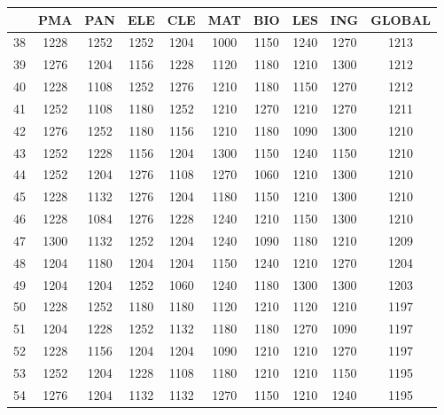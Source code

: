 \documentclass{article}
\begin{document}
\begin{table}
\centering
\begin{tabular}{c|c|c|c|c|c|c|c|c|c|}
\cline{2-10}
& \textbf{PMA} & \textbf{PAN} & \textbf{ELE} & \textbf{CLE} & \textbf{MAT} & \textbf{BIO} & \textbf{LES} & \textbf{ING} & \textbf{GLOBAL} \\ \hline
\multicolumn{1}{|c|}{38}  & 1228 & 1252 & 1252 & 1204 & 1000 & 1150 & 1240 & 1270 & 1213 \\ \hline
\multicolumn{1}{|c|}{39}  & 1276 & 1204 & 1156 & 1228 & 1120 & 1180 & 1210 & 1300 & 1212 \\ \hline
\multicolumn{1}{|c|}{40}  & 1228 & 1108 & 1252 & 1276 & 1210 & 1180 & 1150 & 1270 & 1212 \\ \hline
\multicolumn{1}{|c|}{41}  & 1252 & 1108 & 1180 & 1252 & 1210 & 1270 & 1210 & 1270 & 1211 \\ \hline
\multicolumn{1}{|c|}{42}  & 1276 & 1252 & 1180 & 1156 & 1210 & 1180 & 1090 & 1300 & 1210 \\ \hline
\multicolumn{1}{|c|}{43}  & 1252 & 1228 & 1156 & 1204 & 1300 & 1150 & 1240 & 1150 & 1210 \\ \hline
\multicolumn{1}{|c|}{44}  & 1252 & 1204 & 1276 & 1108 & 1270 & 1060 & 1210 & 1300 & 1210 \\ \hline
\multicolumn{1}{|c|}{45}  & 1228 & 1132 & 1276 & 1204 & 1180 & 1150 & 1210 & 1300 & 1210 \\ \hline
\multicolumn{1}{|c|}{46}  & 1228 & 1084 & 1276 & 1228 & 1240 & 1210 & 1150 & 1300 & 1210 \\ \hline
\multicolumn{1}{|c|}{47}  & 1300 & 1132 & 1252 & 1204 & 1240 & 1090 & 1180 & 1210 & 1209 \\ \hline
\multicolumn{1}{|c|}{48}  & 1204 & 1180 & 1204 & 1204 & 1150 & 1240 & 1210 & 1270 & 1204 \\ \hline
\multicolumn{1}{|c|}{49}  & 1204 & 1204 & 1252 & 1060 & 1240 & 1180 & 1300 & 1300 & 1203 \\ \hline
\multicolumn{1}{|c|}{50}  & 1228 & 1252 & 1180 & 1180 & 1120 & 1210 & 1120 & 1210 & 1197 \\ \hline
\multicolumn{1}{|c|}{51}  & 1204 & 1228 & 1252 & 1132 & 1180 & 1180 & 1270 & 1090 & 1197 \\ \hline
\multicolumn{1}{|c|}{52}  & 1228 & 1156 & 1204 & 1204 & 1090 & 1210 & 1210 & 1270 & 1197 \\ \hline
\multicolumn{1}{|c|}{53}  & 1252 & 1204 & 1228 & 1108 & 1180 & 1210 & 1210 & 1150 & 1195 \\ \hline
\multicolumn{1}{|c|}{54}  & 1276 & 1204 & 1132 & 1132 & 1270 & 1150 & 1210 & 1240 & 1195 \\ \hline

\end{tabular}
\end{table}
\end{document}
